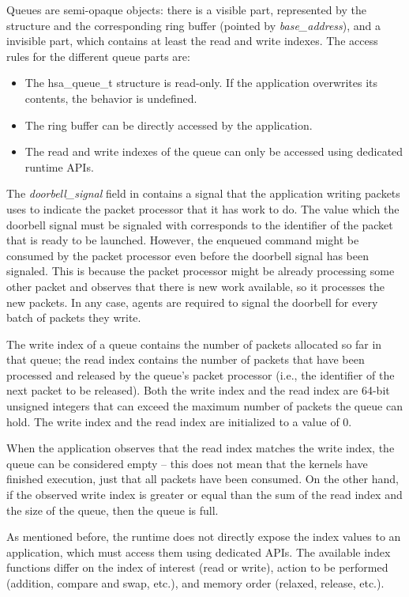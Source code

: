 \documentclass[final]{book}
\newcommand{\reffld}[1]{\textit{#1}}
\begin{document}
Queues are semi-opaque objects: there is a visible part, represented by the
 structure and the corresponding ring buffer (pointed by
\reffld{base_address}), and a invisible part, which contains at least the read
and write indexes. The access rules for the different queue parts are:
\begin{itemize}[itemsep=1pt,topsep=3pt,partopsep=0pt]
\item The {hsa_queue_t} structure is read-only. If the application overwrites
  its contents, the behavior is undefined.
\item The ring buffer can be directly accessed by the application.
\item The read and write indexes of the queue can only be accessed using
  dedicated runtime APIs.
\end{itemize}

The \reffld{doorbell_signal} field in  contains a signal
that the application writing packets uses to indicate the packet processor that
it has work to do. The value which the doorbell signal must be signaled with
corresponds to the identifier of the packet that is ready to be launched.
However, the enqueued command might be consumed by the packet processor even
before the doorbell signal has been signaled. This is because the packet
processor might be already processing some other packet and observes that there
is new work available, so it processes the new packets. In any case, agents are
required to signal the doorbell for every batch of packets they write.

The write index of a queue contains the number of packets allocated so far in
that queue; the read index contains the number of packets that have been
processed and released by the queue's packet processor (i.e., the identifier of
the next packet to be released). Both the write index and the read index are
64-bit unsigned integers that can exceed the maximum number of packets the queue
can hold. The write index and the read index are initialized to a value of 0.

When the application observes that the read index matches the write index, the
queue can be considered empty -- this does not mean that the kernels have
finished execution, just that all packets have been consumed. On the other hand,
if the observed write index is greater or equal than the sum of the read index
and the size of the queue, then the queue is full.

As mentioned before, the runtime does not directly expose the index values to an
application, which must access them using dedicated APIs.  The available index
functions differ on the index of interest (read or write), action to be
performed (addition, compare and swap, etc.), and memory order (relaxed,
release, etc.).
\end{document}
